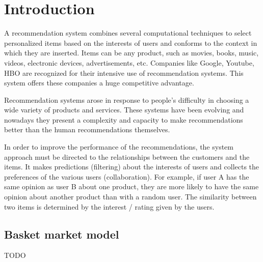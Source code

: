 \section{Introduction}
\label{intro}

A recommendation system combines several computational techniques to select personalized items based on the interests of users and conforms to the context in which they are inserted.
Items can be any product, such as movies, books, music, videos, electronic devices, advertisements, etc.
Companies like Google, Youtube, HBO are recognized for their intensive use of recommendation systems.
This system offers these companies a huge competitive advantage.

Recommendation systems arose in response to people's difficulty in choosing a wide variety of products and services.
These systems have been evolving and nowadays they present a complexity and capacity to make recommendations better than the human recommendations themselves.

In order to improve the performance of the recommendations, the system approach must be directed to the relationships between the customers and the items. 
It makes predictions (filtering) about the interests of users and collects the preferences of the various users (collaboration).
For example, if user A has the same opinion as user B about one product, they are more likely to have the same opinion about another product than with a random user.
The similarity between two items is determined by the interest / rating given by the users.

\subsection{Basket market model}




TODO